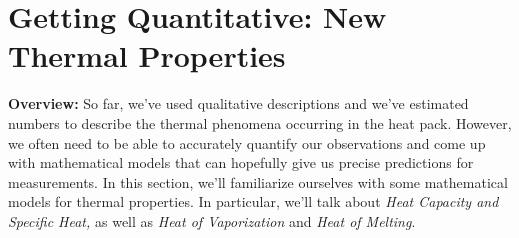 \section{Getting Quantitative: New Thermal Properties}
\label{act1.2.1}

\begin{overview}

\noindent
{\bfseries Overview:} So far, we've used qualitative descriptions and we've estimated numbers to describe the thermal phenomena occurring in the heat pack. However, we often need to be able to accurately quantify our observations and come up with mathematical models that can hopefully give us precise predictions for measurements. In this section, we'll familiarize ourselves with some mathematical models for thermal properties. In particular, we'll talk about \emph{Heat Capacity and Specific Heat,} as well as \emph{Heat of Vaporization} and \emph{Heat of Melting}.

\end{overview}

